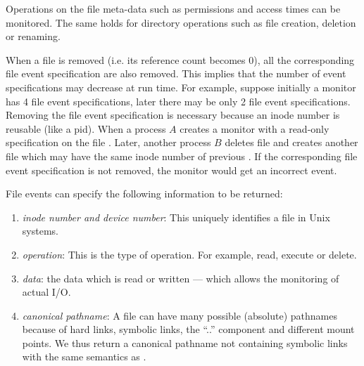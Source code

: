 \begin{enumerate}
Operations on the file meta-data such as permissions and access times
can be monitored. The same holds for directory operations such as file
creation, deletion or renaming.

\end{enumerate}

When a file is removed (i.e. its reference count becomes 0),
all the corresponding file event specification are also removed.
This implies that the number of event specifications may decrease at run time.
For example, suppose initially a monitor has 4 file event specifications,
later there may be only 2 file event specifications.
Removing the file event specification is necessary
because an inode number is reusable (like a pid).
When a process $A$ creates a monitor with a read-only specification on
the file .
Later, another process $B$ deletes file 
and creates another file 
which may have the same inode number of previous .
If the corresponding file event specification is not removed, the monitor
would get an incorrect event.

File events can specify the following information to be returned:
\begin{enumerate}
\item {\em inode number and device number}:
This uniquely identifies a file in Unix systems.

\item {\em operation}:
This is the type of operation. For example, read, execute or delete.

\item {\em data}:
the data which is read or written --- which allows the monitoring of actual
I/O.

\item {\em canonical pathname}:
A file can have many possible (absolute) pathnames because of hard links,
symbolic links, the ``..'' component and different mount points.
We thus return a canonical pathname 
not containing symbolic links with
the same semantics as .
\end{enumerate}

